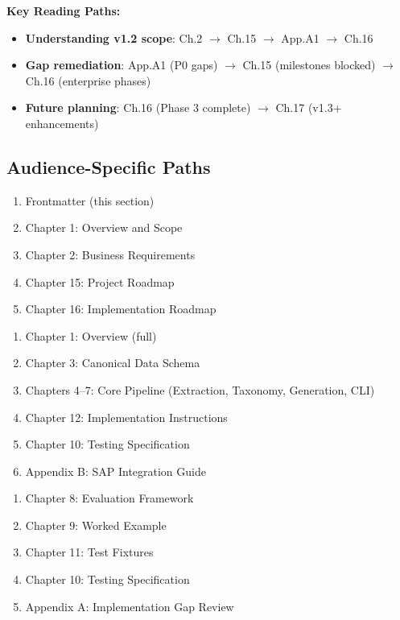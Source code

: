 \documentclass[12pt,a4paper,twoside]{report}
\begin{document}
\noindent
\textbf{Key Reading Paths:}
\begin{itemize}
\item \textbf{Understanding v1.2 scope}: Ch.2 $\to$ Ch.15 $\to$ App.A1 $\to$ Ch.16
\item \textbf{Gap remediation}: App.A1 (P0 gaps) $\to$ Ch.15 (milestones blocked) $\to$ Ch.16 (enterprise phases)
\item \textbf{Future planning}: Ch.16 (Phase 3 complete) $\to$ Ch.17 (v1.3+ enhancements)
\end{itemize}

\subsection*{Audience-Specific Paths}

\begin{tcolorbox}[colback=gray!5,colframe=gray!50,title=\faIcon{user-graduate} For Project Managers / Business Owners]
\begin{enumerate}
\item Frontmatter (this section)
\item Chapter 1: Overview and Scope
\item Chapter 2: Business Requirements
\item Chapter 15: Project Roadmap
\item Chapter 16: Implementation Roadmap
\end{enumerate}
\end{tcolorbox}

\begin{tcolorbox}[colback=gray!5,colframe=gray!50,title=\faIcon{laptop-code} For Implementers / Developers]
\begin{enumerate}
\item Chapter 1: Overview (full)
\item Chapter 3: Canonical Data Schema
\item Chapters 4--7: Core Pipeline (Extraction, Taxonomy, Generation, CLI)
\item Chapter 12: Implementation Instructions
\item Chapter 10: Testing Specification
\item Appendix B: SAP Integration Guide
\end{enumerate}
\end{tcolorbox}

\begin{tcolorbox}[colback=gray!5,colframe=gray!50,title=\faIcon{microscope} For Quality / Evaluation Engineers]
\begin{enumerate}
\item Chapter 8: Evaluation Framework
\item Chapter 9: Worked Example
\item Chapter 11: Test Fixtures
\item Chapter 10: Testing Specification
\item Appendix A: Implementation Gap Review
\end{enumerate}
\end{tcolorbox}
\end{document}
